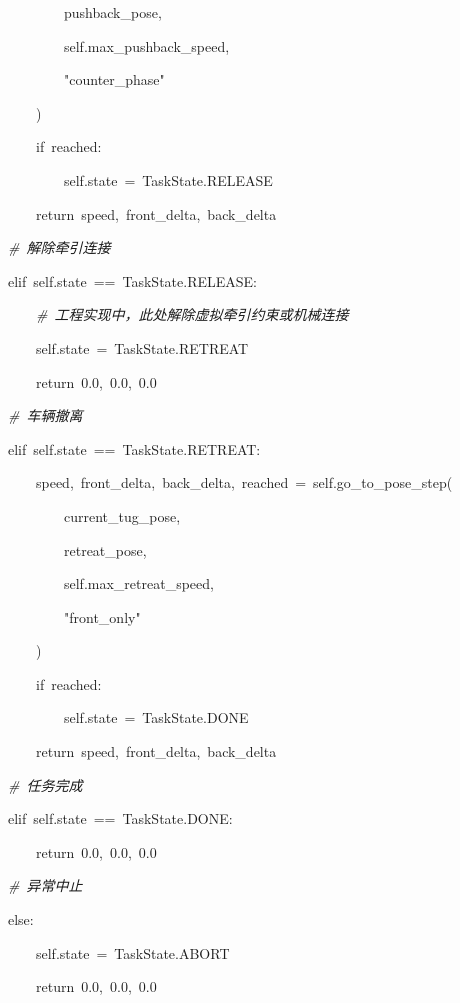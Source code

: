 ~~~~~~~~~~~~~~~~pushback\_pose,

~~~~~~~~~~~~~~~~self.max\_pushback\_speed,

~~~~~~~~~~~~~~~~"counter\_phase"

~~~~~~~~~~~~)

~~~~~~~~~~~~if~reached:

~~~~~~~~~~~~~~~~self.state~=~TaskState.RELEASE

~~~~~~~~~~~~return~speed,~front\_delta,~back\_delta

~~~~~~~~\emph{\#~解除牵引连接}

~~~~~~~~elif~self.state~==~TaskState.RELEASE:

~~~~~~~~~~~~\emph{\#~工程实现中，此处解除虚拟牵引约束或机械连接}

~~~~~~~~~~~~self.state~=~TaskState.RETREAT

~~~~~~~~~~~~return~0.0,~0.0,~0.0

~~~~~~~~\emph{\#~车辆撤离}

~~~~~~~~elif~self.state~==~TaskState.RETREAT:

~~~~~~~~~~~~speed,~front\_delta,~back\_delta,~reached~=~self.go\_to\_pose\_step(

~~~~~~~~~~~~~~~~current\_tug\_pose,

~~~~~~~~~~~~~~~~retreat\_pose,

~~~~~~~~~~~~~~~~self.max\_retreat\_speed,

~~~~~~~~~~~~~~~~"front\_only"

~~~~~~~~~~~~)

~~~~~~~~~~~~if~reached:

~~~~~~~~~~~~~~~~self.state~=~TaskState.DONE

~~~~~~~~~~~~return~speed,~front\_delta,~back\_delta

~~~~~~~~\emph{\#~任务完成}

~~~~~~~~elif~self.state~==~TaskState.DONE:

~~~~~~~~~~~~return~0.0,~0.0,~0.0

~~~~~~~~\emph{\#~异常中止}

~~~~~~~~else:

~~~~~~~~~~~~self.state~=~TaskState.ABORT

~~~~~~~~~~~~return~0.0,~0.0,~0.0

\label{_Toc228997229}{}